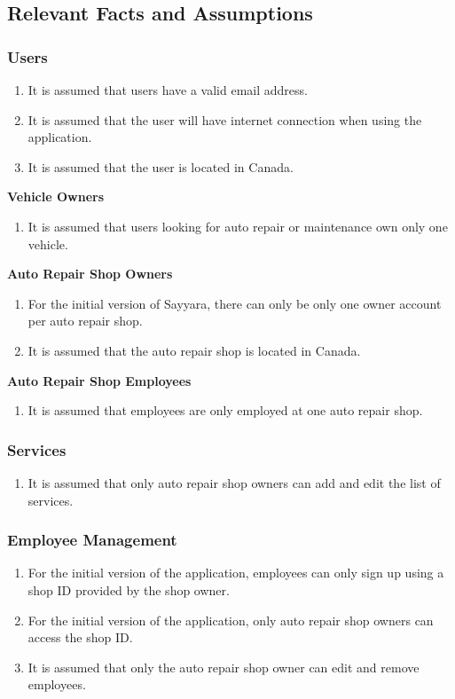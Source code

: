 \documentclass[12pt]{article}
\begin{document}
\subsection{Relevant Facts and Assumptions}
\subsubsection{Users}
\begin{enumerate}
	\item It is assumed that users have a valid email address.
	\item It is assumed that the user will have internet connection when using the application.
	\item It is assumed that the user is located in Canada.
\end{enumerate}

\textbf{Vehicle Owners}
\begin{enumerate}
	\item It is assumed that users looking for auto repair or maintenance own only one vehicle.
\end{enumerate}

\textbf{Auto Repair Shop Owners}
\begin{enumerate}
	\item For the initial version of Sayyara, there can only be only one owner account per auto repair shop.
	\item It is assumed that the auto repair shop is located in Canada.
\end{enumerate}

\textbf{Auto Repair Shop Employees}
\begin{enumerate}
	\item It is assumed that employees are only employed at one auto repair shop.
\end{enumerate}

\subsubsection{Services}
\begin{enumerate}
	\item It is assumed that only auto repair shop owners can add and edit the list of services.
\end{enumerate}

\subsubsection{Employee Management}
\begin{enumerate}
	\item For the initial version of the application, employees can only sign up using a shop ID provided by
	      the shop owner.
	\item For the initial version of the application, only auto repair shop owners can access the shop ID.
	\item It is assumed that only the auto repair shop owner can edit and remove employees.
\end{enumerate}
\end{document}
